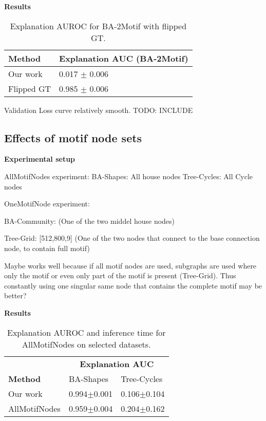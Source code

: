 \textbf{Results}

\begin{table}[ht]
    \centering
    \scriptsize
    \begin{tabularx}{0.4\textwidth}{l X}
        \toprule
        \textbf{Method} & \textbf{Explanation AUC (BA-2Motif)} \\
        \midrule
        Our work       & 0.017 $\pm$ 0.006 \\
        Flipped GT     & 0.985 $\pm$ 0.006 \\
        \bottomrule
    \end{tabularx}
    \caption[Inductive performance on BA-2Motif with flipped ground truth]{Explanation AUROC for BA-2Motif with flipped GT.}
    \label{tab:allmotifnodes_selected}
\end{table}

Validation Loss curve relatively smooth. TODO: INCLUDE

\subsection{Effects of motif node sets}

\textbf{Experimental setup}

AllMotifNodes experiment:
BA-Shapes: All house nodes
Tree-Cycles: All Cycle nodes
\bigskip


OneMotifNode experiment:

BA-Community:
(One of the two middel house nodes)

Tree-Grid:
[512,800,9]
(One of the two nodes that connect to the base connection node, to contain full motif)

Maybe works well because if all motif nodes are used, subgraphs are used where only the motif or even only part of the motif is present (Tree-Grid). Thus constantly using one singular same node that contains the complete motif may be better?


\textbf{Results}

\begin{table}[ht]
    \centering
    \scriptsize
    \begin{tabularx}{0.6\textwidth}{l*{2}{X}}   %
    \toprule
    \textbf{} & \multicolumn{2}{c}{\textbf{Explanation AUC}} \\
    \cmidrule{2-3}
    \textbf{Method} & BA-Shapes & Tree-Cycles \\
    \midrule
    Our work & 0.994$\pm$0.001 & 0.106$\pm$0.104 \\
    \midrule
    AllMotifNodes & 0.959$\pm$0.004 & 0.204$\pm$0.162 \\
    \bottomrule
    \end{tabularx}
    \caption[Inductive performance using all motif nodes for training]{Explanation AUROC and inference time for AllMotifNodes on selected datasets.}
    \label{tab:allmotifnodes_selected}
\end{table}

